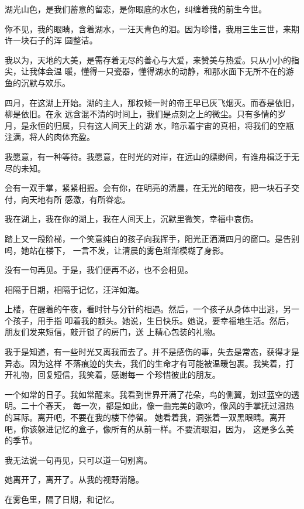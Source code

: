 		湖光山色，是我们蓄意的留恋，是你眼底的水色，纠缠着我的前生今世。

		你不见，我的眼睛，含着湖水，一汪天青色的泪。因为珍惜，我用三生三世，来期许一块石子的浑
	圆整洁。

		我以为，天地的大美，是需存着无尽的善心与大爱，来赞美与热爱。只从小小的指尖，让我体会温
	暖，懂得一只瓷器，懂得湖水的动静，和那水面下无所不在的游鱼的沉默与欢乐。


		四月，在这湖上开始。湖的主人，那权倾一时的帝王早已灰飞烟灭。而春是依旧，柳是依旧。在永
	远含混不清的时间上，我们是点刻之上的微尘。只有多情的岁月，是永恒的归属，只有这人间天上的湖
	水，暗示着宇宙的真相，将我们的空瓶注满，将人的肉体充盈。


		我愿意，有一种等待。我愿意，在时光的对岸，在远山的缥缈间，有谁舟楫泛于无尽的未知。

		会有一双手掌，紧紧相握。会有你，在明亮的清晨，在无光的暗夜，把一块石子交付，向天地有所
	感激，有所眷恋。


		我在湖上，我在你的湖上，我在人间天上，沉默里微笑，幸福中哀伤。

	\endwriting



		踏上又一段阶梯，一个笑意纯白的孩子向我挥手，阳光正洒满四月的窗口。是告别吗，她站在楼下，
	一言不发，让清晨的雾色渐渐模糊了身影。

		没有一句再见。于是，我们便再不必，也不会相见。

		相隔于日期，相隔于记忆，汪洋如海。

		上楼，在醒着的午夜，看时针与分针的相遇。然后，一个孩子从身体中出逃，另一个孩子，用手指
	叩着我的额头。她说，生日快乐。她说，要幸福地生活。然后，朋友们发来短信，敲开锁了的房门，送
	上精心包装的礼物。

		我于是知道，有一些时光又离我而去了。并不是感伤的事，失去是常态，获得才是异态。因为这样
	不落痕迹的失去，我们的生命才有可能被温暖包裹。我笑着，打开礼物，回复短信，我笑着，感谢每一
	个珍惜彼此的朋友。

		一个如常的日子。我如常醒来。我看到世界开满了花朵，鸟的侧翼，划过蓝空的透明。二十个春天，
	每一次，都是如此，像一曲完美的歌吟，像风的手掌抚过温热的耳际。离开吧，不要在我的楼下停留。
	她看着我，洞张着一双黑眼睛。离开吧，你该躲进记忆的盒子，像所有的从前一样。不要流眼泪，因为，
	这是多么美的季节。


		我无法说一句再见，只可以道一句别离。

		她离开了，离开了。从我的视野消隐。

		在雾色里，隔了日期，和记忆。

